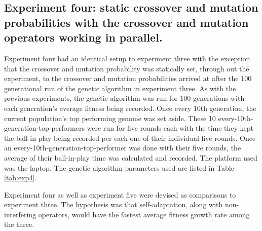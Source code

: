 \documentclass[a4paper,10pt]{article}
\begin{document}
\subsection{Experiment four: static crossover and mutation probabilities with the crossover and mutation operators working in parallel.}

Experiment four had an identical setup to experiment three with the exception that the crossover and mutation probability was statically set, through out the experiment, to the crossover and mutation probabilities arrived at after the 100 generational run of the genetic algorithm in experiment three. As with the previous experiments, the genetic algorithm was run for 100 generations with each generation's average fitness being recorded. Once every 10th generation, the current population's top performing genome was set aside. These 10 every-10th-generation-top-performers were run for five rounds each with the time they kept the ball-in-play being recorded per each one of their individual five rounds. Once an every-10th-generation-top-performer was done with their five rounds, the average of their ball-in-play time was calculated and recorded. The platform used was the laptop. The genetic algorithm parameters used are listed in Table \ref{tab:exp4}.

Experiment four as well as experiment five were devised as comparisons to experiment three. The hypothesis was that self-adaptation, along with non-interfering operators, would have the fastest average fitness growth rate among the three.
\end{document}
